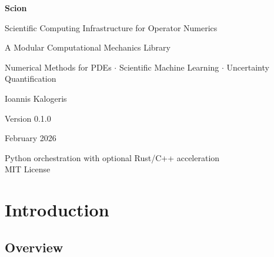\documentclass[11pt,a4paper]{report}
\begin{document}
\begin{titlepage}
\centering
\vspace*{3cm}

{\Huge\bfseries\textcolor{scionblue}{Scion}\par}
\vspace{0.3cm}
{\large\textcolor{codegray}{Scientific Computing Infrastructure for Operator Numerics}\par}
\vspace{0.5cm}
{\Large\textcolor{codegray}{A Modular Computational Mechanics Library}\par}

\vspace{2cm}

{\large
Numerical Methods for PDEs $\cdot$ Scientific Machine Learning $\cdot$ Uncertainty Quantification
\par}

\vspace{3cm}

{\large Ioannis Kalogeris\par}
\vspace{0.5cm}
{\normalsize Version 0.1.0\par}
\vspace{0.3cm}
{\normalsize\textcolor{codegray}{February 2026}\par}

\vfill

{\small
Python orchestration with optional Rust/C++ acceleration\\
MIT License
\par}
\end{titlepage}

\tableofcontents
\newpage

\chapter{Introduction}

\section{Overview}
\end{document}
